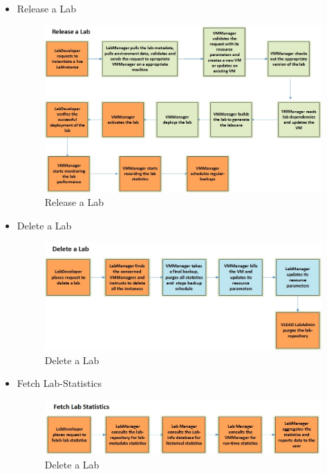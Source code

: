 \documentclass[11pt]{article}
\begin{document}
\begin{itemize}
\item Release a Lab\\
\label{sec-3.4.4}


\begin{figure}[H]
\centering
\includegraphics[width=16cm]{Release-a-lab.jpg}
\caption{Release a Lab}
\end{figure}


\item Delete a Lab\\
\label{sec-3.4.5}


\begin{figure}[H]
\centering
\includegraphics[width=16cm]{Delete-a-lab.jpg}
\caption{Delete a Lab}
\end{figure}


\item Fetch Lab-Statistics\\
\label{sec-3.4.6}


\begin{figure}[H]
\centering
\includegraphics[width=16cm]{Fetch-lab-statistics.jpg}
\caption{Delete a Lab}
\end{figure}



\end{itemize}
\end{document}
